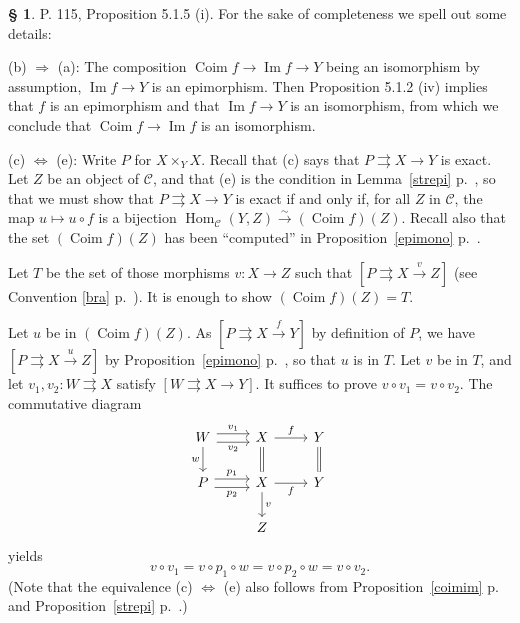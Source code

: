 \documentclass[12pt]{article}%
\theoremstyle{remark}
\theoremstyle{definition}
\newtheorem{s}[thm]{\S}%
\newcommand{\nn}{\noindent}
\newcommand{\C}{\mathcal C}
\newcommand{\parar}{\rightrightarrows}
\newcommand{\then}{\Rightarrow}
\newcommand{\ssi}{\Leftrightarrow}%
\newcommand{\xr}{\xrightarrow}
\DeclareMathOperator{\Coim}{Coim}
\DeclareMathOperator{\Ima}{Im}
\DeclareMathOperator{\Hom}{Hom}%
\begin{document}
\begin{s}\label{515i}
P. 115, Proposition 5.1.5 (i). For the sake of completeness we spell out some details:

\nn(b) $\then$ (a): The composition $\Coim f\to\Ima f\to Y$ being an isomorphism by assumption, $\Ima f\to Y$ is an epimorphism. Then Proposition 5.1.2 (iv) implies that $f$ is an epimorphism and that $\Ima f\to Y$ is an isomorphism, from which we conclude that $\Coim f\to\Ima f$ is an isomorphism.

\nn(c) $\ssi$ (e): Write $P$ for $X\times_YX$. Recall that (c) says that $P\parar X\to Y$ is exact. Let $Z$ be an object of $\C$, and that (e) is the condition in Lemma~\ref{strepi} p.~\pageref{strepi}, so that we must show that $P\parar X\to Y$ is exact if and only if, for all $Z$ in $\C$, the map $u\mapsto u\circ f$ is a bijection $\Hom_\C(Y,Z)\xr\sim(\Coim f)(Z)$. Recall also that the set $(\Coim f)(Z)$ has been ``computed'' in Proposition~\ref{epimono} p.~\pageref{epimono}.

Let $T$ be the set of those morphisms $v:X\to Z$ such that $[P\parar X\xr vZ]$ (see Convention \ref{bra} p.~\pageref{bra}). It is enough to show $(\Coim f)(Z)=T$.

Let $u$ be in $(\Coim f)(Z)$. As $[P\parar X\xr fY]$ by definition of $P$, we have $[P\parar X\xr uZ]$ by Proposition~\ref{epimono} p.~\pageref{epimono}, so that $u$ is in $T$. Let $v$ be in $T$, and let $v_1,v_2:W\parar X$ satisfy $[W\parar X\to Y]$. It suffices to prove $v\circ v_1=v\circ v_2$. The commutative diagram  
$$
\begin{tikzcd}
W\ar[yshift=0.7ex]{r}{v_1}\ar[yshift=-0.7ex]{r}[swap]{v_2}\ar{d}[swap]{w}&X\ar{r}{f}\ar[equal]{d}&Y\ar[equal]{d}\\ 
P\ar[yshift=0.7ex]{r}{p_1}\ar[yshift=-0.7ex]{r}[swap]{p_2}&X\ar{r}[swap]{f}\ar{d}{v}&Y\\ 
{}&Z
\end{tikzcd}
$$ 
yields
$$
v\circ v_1=v\circ p_1\circ w=v\circ p_2\circ w=v\circ v_2.
$$
(Note that the equivalence (c) $\ssi$ (e) also follows from Proposition~\ref{coimim} p.~\pageref{coimim} and Proposition~\ref{strepi} p.~\pageref{strepi}.)
\end{s}

%
\end{document}
